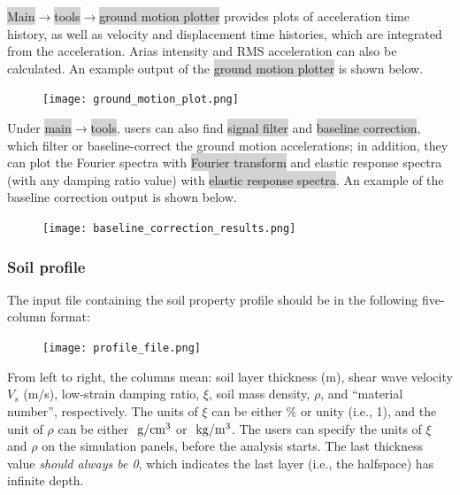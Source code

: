 \documentclass[11pt,letterpaper]{article}
\newcommand{\panel}[1]{\colorbox{lightgray}{\textsf{#1}}}
\begin{document}
\panel{Main}$\rightarrow$\panel{tools}$\rightarrow$\panel{ground motion plotter} provides plots of acceleration time history, as well as velocity and displacement time histories, which are integrated from the acceleration. Arias intensity and RMS acceleration can also be calculated. An example output of the \panel{ground motion plotter} is shown below.

\begin{figure}[H]
\centering
  \texttt{[image: ground\_motion\_plot.png]}\\
\end{figure}

Under \panel{main}$\rightarrow$\panel{tools}, users can also find \panel{signal filter} and \panel{baseline correction}, which filter or baseline-correct the ground motion accelerations; in addition, they can plot the Fourier spectra with \panel{Fourier transform} and elastic response spectra (with any damping ratio value) with \panel{elastic response spectra}. An example of the baseline correction output is shown below.

\begin{figure}[H]
\centering
  \texttt{[image: baseline\_correction\_results.png]}\\
\end{figure}

\subsubsection{Soil profile}\label{sec:soil_profile}

The input file containing the soil property profile should be in the following five-column format:

\begin{figure}[H]
\centering
  \texttt{[image: profile\_file.png]}\\
\end{figure}

From left to right, the columns mean: soil layer thickness (m), shear wave velocity $V_s$ (m/s), low-strain damping ratio, $\xi$, soil mass density, $\rho$, and ``material number'', respectively. The units of $\xi$ can be either \% or unity (i.e., 1), and the unit of $\rho$ can be either $~\mathrm{g/cm^3}$ or $~\mathrm{kg/m^3}$. The users can specify the units of $\xi$ and $\rho$ on the simulation panels, before the analysis starts. The last thickness value \emph{should always be 0}, which indicates the last layer (i.e., the halfspace) has infinite depth.
\end{document}
